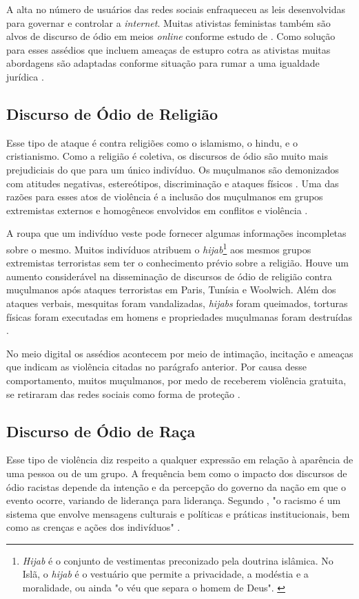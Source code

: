 A alta no número de usuários das redes sociais enfraqueceu as leis desenvolvidas para governar e controlar a \textit{internet}. Muitas ativistas feministas também são alvos de discurso de ódio em meios \textit{online} conforme estudo de 
. Como solução para esses assédios que incluem ameaças de estupro cotra as ativistas muitas abordagens são adaptadas conforme situação para rumar a uma igualdade jurídica \cite{Levy2017}. 

\subsection{Discurso de Ódio de Religião}
Esse tipo de ataque é contra religiões como o islamismo, o hindu, e o cristianismo. Como a religião é coletiva, os discursos de ódio são muito mais prejudiciais do que para um único indivíduo. Os muçulmanos são demonizados com atitudes negativas, estereótipos, discriminação e ataques físicos \cite{Chetty2018}. Uma das razões para esses atos de violência é a inclusão dos muçulmanos em grupos extremistas externos e homogêneos envolvidos em conflitos e violência \cite{Trnberg2016}.  

A roupa que um indivíduo veste pode fornecer algumas informações incompletas sobre o mesmo. Muitos indivíduos atribuem o \textit{hijab}\footnote{\textit{Hijab} é o conjunto de vestimentas preconizado pela doutrina islâmica. No Islã, o \textit{hijab} é o vestuário que permite a privacidade, a modéstia e a moralidade, ou ainda "o véu que separa o homem de Deus". \cite{9780742562967}} aos mesmos grupos extremistas terroristas sem ter o conhecimento prévio sobre a religião. Houve um aumento considerável na disseminação de discursos de ódio de religião contra muçulmanos após ataques terroristas em Paris, Tunísia e Woolwich. Além dos ataques verbais, mesquitas foram vandalizadas, \textit{hijabs} foram queimados, torturas físicas foram executadas em homens e propriedades muçulmanas foram destruídas \cite{Awan2016,Chetty2018}.

No meio digital os assédios acontecem por meio de intimação, incitação e ameaças que indicam as violência citadas no parágrafo anterior. Por causa desse comportamento, muitos muçulmanos, por medo de receberem violência gratuita, se retiraram das redes sociais como forma de proteção \cite{Chetty2018}.

\subsection{Discurso de Ódio de Raça}
Esse tipo de violência diz respeito a qualquer expressão em relação à aparência de uma pessoa ou de um grupo. A frequência bem como o impacto dos discursos de ódio racistas depende da intenção e da percepção do governo da nação em que o evento ocorre, variando de liderança para liderança. Segundo , "o racismo é um sistema que envolve mensagens culturais e políticas e práticas institucionais, bem como as crenças e ações dos indivíduos" \cite{tatum2001defining}.

